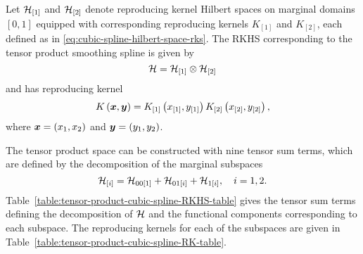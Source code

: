 \bigskip

Let $\mathcal{H}_{\left[1\right]}$ and $\mathcal{H}_{\left[2\right]}$ denote reproducing kernel Hilbert spaces on marginal domains $\left[0, 1\right]$ equipped with corresponding reproducing kernels $K_{\left[1\right]}$ and $K_{\left[2\right]}$, each defined as in \eqref{eq:cubic-spline-hilbert-space-rks}. The RKHS corresponding to the tensor product smoothing spline is given by
\[
\mathcal{H} = \mathcal{H}_{\left[1\right]} \otimes \mathcal{H}_{\left[2\right]}
\]
\noindent
and has reproducing kernel 
\[
K\left(\mbox{\boldmath $x$},\mbox{\boldmath $y$}\right) = K_{\left[1\right]}\left(x_{\left[1\right]},y_{\left[1\right]}\right) K_{\left[2\right]}\left(x_{\left[2\right]},y_{\left[2\right]}\right),
\]
\noindent 
where $\mbox{\boldmath $x$} = \left(x_1, x_2\right)$ and $\mbox{\boldmath $y$} = \left(y_1, y_2\right)$.

\bigskip

The tensor product space can be constructed with nine tensor sum terms, which are defined by the decomposition of the marginal subspaces
\[
\mathcal{H}_{\left[i\right]} = \mathcal{H}_{00\left[1\right]}  +  \mathcal{H}_{01\left[i\right]} + \mathcal{H}_{1\left[i\right]}, \quad i = 1,2.
\]
\noindent
Table~\ref{table:tensor-product-cubic-spline-RKHS-table} gives the tensor sum terms defining the decomposition of $\mathcal{H}$ and the functional components corresponding to each subspace. The reproducing kernels for each of the subspaces are given in Table~\ref{table:tensor-product-cubic-spline-RK-table}.


